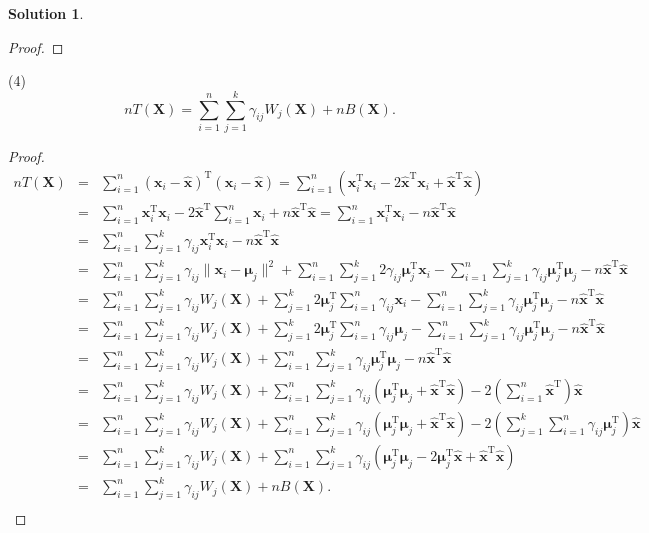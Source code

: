 \documentclass[a4paper,UTF8]{article}
\numberwithin{equation}{section}
\theoremstyle{definition}
\newtheorem*{solution}{Solution}
\begin{document}
\begin{solution}
\begin{proof}
\end{proof}
\item[(4)] 
\begin{equation}
nT(\bm{X})=\sum_{i=1}^n\sum_{j=1}^k\gamma_{ij}W_j(\bm{X})+nB(\bm{X}).
\end{equation}
\begin{proof}
\allowdisplaybreaks
\begin{eqnarray}
nT(\bm{X})&=&\sum_{i=1}^n(\bm{x}_i-\hat{\bm{x}})^\mathrm{T}(\bm{x}_i-\hat{\bm{x}})=\sum_{i=1}^n(\bm{x}_i^\mathrm{T}\bm{x}_i-2\bm{\hat{x}}^\mathrm{T}\bm{x}_i+\hat{\bm{x}}^\mathrm{T}\hat{\bm x})\nonumber\\
&=&\sum_{i=1}^n\bm{x}_i^\mathrm{T}\bm{x}_i-2\bm{\hat{x}}^\mathrm{T}\sum_{i=1}^n\bm{x}_i+n\hat{\bm{x}}^\mathrm{T}\hat{\bm x}=\sum_{i=1}^n\bm{x}_i^\mathrm{T}\bm{x}_i-n\hat{\bm{x}}^\mathrm{T}\hat{\bm x}\nonumber\\
&=&\sum_{i=1}^n\sum_{j=1}^k\gamma_{ij}\bm{x}_i^\mathrm{T}\bm{x}_i-n\hat{\bm{x}}^\mathrm{T}\hat{\bm x}\nonumber\\
&=&\sum_{i=1}^n\sum_{j=1}^k\gamma_{ij}\|\bm{x}_i-\bm\mu_j\|^2+\sum_{i=1}^n\sum_{j=1}^k2\gamma_{ij}\bm\mu_j^\mathrm{T}\bm{x}_i-\sum_{i=1}^n\sum_{j=1}^k\gamma_{ij}\bm\mu_j^\mathrm{T}\bm\mu_j-n\hat{\bm{x}}^\mathrm{T}\hat{\bm x}\nonumber\\
&=&\sum_{i=1}^n\sum_{j=1}^k\gamma_{ij}W_j(\bm{X})+\sum_{j=1}^k2\bm\mu_j^\mathrm{T}\sum_{i=1}^n\gamma_{ij}\bm{x}_i-\sum_{i=1}^n\sum_{j=1}^k\gamma_{ij}\bm\mu_j^\mathrm{T}\bm\mu_j-n\hat{\bm{x}}^\mathrm{T}\hat{\bm x}\nonumber\\
&=&\sum_{i=1}^n\sum_{j=1}^k\gamma_{ij}W_j(\bm{X})+\sum_{j=1}^k2\bm\mu_j^\mathrm{T}\sum_{i=1}^n\gamma_{ij}\bm\mu_j-\sum_{i=1}^n\sum_{j=1}^k\gamma_{ij}\bm\mu_j^\mathrm{T}\bm\mu_j-n\hat{\bm{x}}^\mathrm{T}\hat{\bm x}\nonumber\\
&=&\sum_{i=1}^n\sum_{j=1}^k\gamma_{ij}W_j(\bm{X})+\sum_{i=1}^n\sum_{j=1}^k\gamma_{ij}\bm\mu_j^\mathrm{T}\bm\mu_j-n\hat{\bm{x}}^\mathrm{T}\hat{\bm x}\nonumber\\
&=&\sum_{i=1}^n\sum_{j=1}^k\gamma_{ij}W_j(\bm{X})+\sum_{i=1}^n\sum_{j=1}^k\gamma_{ij}(\bm\mu_j^\mathrm{T}\bm\mu_j+\hat{\bm{x}}^\mathrm{T}\hat{\bm x})-2\left(\sum_{i=1}^n\hat{\bm{x}}^\mathrm{T}\right)\hat{\bm x}\nonumber\\
&=&\sum_{i=1}^n\sum_{j=1}^k\gamma_{ij}W_j(\bm{X})+\sum_{i=1}^n\sum_{j=1}^k\gamma_{ij}(\bm\mu_j^\mathrm{T}\bm\mu_j+\hat{\bm{x}}^\mathrm{T}\hat{\bm x})-2\left(\sum_{j=1}^k\sum_{i=1}^n\gamma_{ij}\bm\mu_j^\mathrm{T}\right)\hat{\bm x}\nonumber\\
&=&\sum_{i=1}^n\sum_{j=1}^k\gamma_{ij}W_j(\bm{X})+\sum_{i=1}^n\sum_{j=1}^k\gamma_{ij}(\bm\mu_j^\mathrm{T}\bm\mu_j-2\bm\mu_j^\mathrm{T}\hat{\bm x}+\hat{\bm{x}}^\mathrm{T}\hat{\bm x})\nonumber\\
&=&\sum_{i=1}^n\sum_{j=1}^k\gamma_{ij}W_j(\bm{X})+nB(\bm{X}).\nonumber\\
\end{eqnarray}
\end{proof}


\end{solution}
\end{document}
